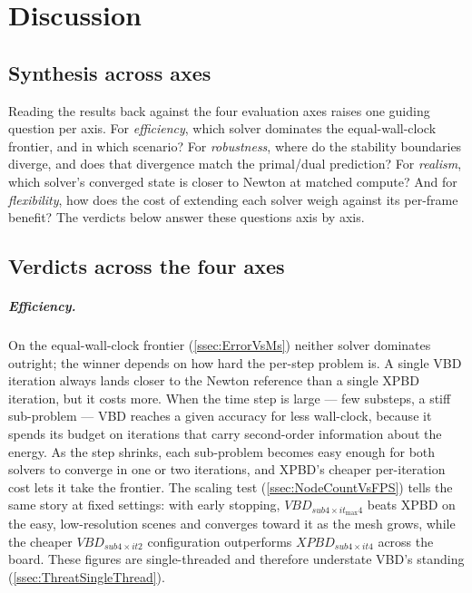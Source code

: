 \chapter{Discussion}
\label{chap:Discussion}

\section{Synthesis across axes}
\label{sec:Synthesis}
Reading the results back against the four evaluation axes raises one guiding
question per axis. For \emph{efficiency}, which solver dominates the
equal-wall-clock frontier, and in which scenario? For \emph{robustness}, where do
the stability boundaries diverge, and does that divergence match the primal/dual
prediction? For \emph{realism}, which solver's converged state is closer to Newton
at matched compute? And for \emph{flexibility}, how does the cost of extending each
solver weigh against its per-frame benefit? The verdicts below answer these
questions axis by axis.

\section{Verdicts across the four axes}
\label{sec:Verdicts}

\paragraph{Efficiency.}
On the equal-wall-clock frontier (\autoref{ssec:ErrorVsMs}) neither solver
dominates outright; the winner depends on how hard the per-step problem is. A
single VBD iteration always lands closer to the Newton reference than a single
XPBD iteration, but it costs more. When the time step is large --- few substeps,
a stiff sub-problem --- VBD reaches a given accuracy for less wall-clock, because
it spends its budget on iterations that carry second-order information about the
energy. As the step shrinks, each sub-problem becomes easy enough for both
solvers to converge in one or two iterations, and XPBD's cheaper per-iteration
cost lets it take the frontier. The scaling test (\autoref{ssec:NodeCountVsFPS})
tells the same story at fixed settings: with early stopping,
$VBD_{sub4\times it_{\max}4}$ beats XPBD on the easy, low-resolution scenes and
converges toward it as the mesh grows, while the cheaper $VBD_{sub4\times it2}$
configuration outperforms $XPBD_{sub4\times it4}$ across the board. These figures
are single-threaded and therefore understate VBD's standing
(\autoref{ssec:ThreatSingleThread}).

